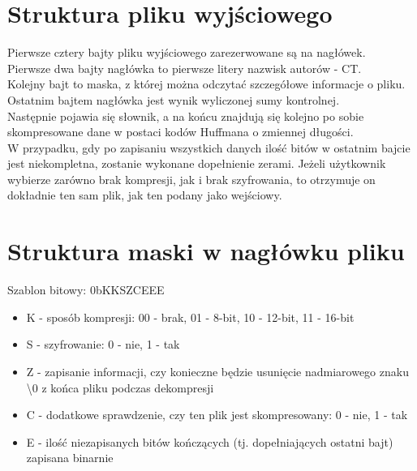 \documentclass[]{article}
\begin{document}
\section{Struktura pliku wyjściowego}\label{header-n279}
Pierwsze cztery bajty pliku wyjściowego zarezerwowane są na nagłówek. \\
Pierwsze dwa bajty nagłówka to pierwsze litery nazwisk autorów - CT.\\
Kolejny bajt to maska, z której można odczytać szczegółowe informacje o pliku. Ostatnim bajtem nagłówka jest wynik wyliczonej sumy kontrolnej.\\
Następnie pojawia się słownik, a na końcu znajdują się kolejno po sobie skompresowane dane w postaci kodów Huffmana o zmiennej długości.\\
W przypadku, gdy po zapisaniu wszystkich danych ilość bitów w ostatnim bajcie jest niekompletna, zostanie wykonane dopełnienie zerami. Jeżeli użytkownik wybierze zarówno brak kompresji, jak i brak szyfrowania, to otrzymuje on dokładnie ten sam plik, jak ten podany jako wejściowy.
\section{Struktura maski w nagłówku pliku}\label{header-n279}

    Szablon bitowy: 0bKKSZCEEE
\begin{itemize}
   \item K - sposób kompresji: 00 - brak, 01 - 8-bit, 10 - 12-bit, 11 - 16-bit
   \item  S - szyfrowanie: 0 - nie, 1 - tak
   \item  Z - zapisanie informacji, czy konieczne będzie usunięcie nadmiarowego znaku \textbackslash0 z końca pliku podczas dekompresji
   \item  C - dodatkowe sprawdzenie, czy ten plik jest skompresowany: 0 - nie, 1 - tak
   \item  E - ilość niezapisanych bitów kończących (tj. dopełniających ostatni bajt) zapisana binarnie
\end{itemize}
\end{document}
